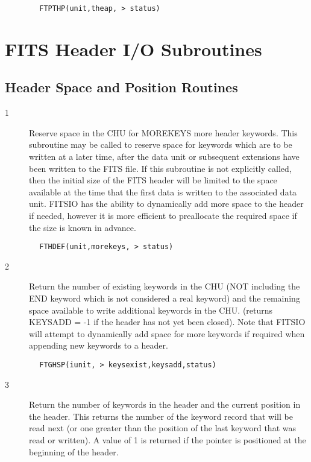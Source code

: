 \documentclass[11pt]{book}
\begin{document}
\begin{verbatim}
        FTPTHP(unit,theap, > status)
\end{verbatim}


\section{FITS Header I/O Subroutines}


\subsection{Header Space and Position Routines \label{FTHDEF}}


\begin{description}
\item[1 ] Reserve space in the CHU for MOREKEYS more header keywords.
    This subroutine may be called to reserve space for keywords which are
    to be written at a later time, after the data unit or subsequent
    extensions have been written to the FITS file.  If this subroutine is
    not explicitly called, then the initial size of the FITS header will be
    limited to the space available at the time that  the first data is written
    to the associated data unit.   FITSIO has the ability to dynamically
    add more space to the header if needed, however it is more efficient
   to preallocate the required space if the size is known in advance.
\end{description}

\begin{verbatim}
        FTHDEF(unit,morekeys, > status)
\end{verbatim}

\begin{description}
\item[2 ] Return the number of existing keywords in the CHU (NOT including the
    END keyword which is not considered a real keyword) and the remaining
    space available to write additional keywords in the CHU.  (returns
    KEYSADD = -1 if the header has not yet been closed).
    Note that FITSIO will attempt to dynamically add space for more
   keywords if required when appending new keywords to a header.
\end{description}

\begin{verbatim}
        FTGHSP(iunit, > keysexist,keysadd,status)
\end{verbatim}

\begin{description}
\item[3 ] Return the number of keywords in the header and the current position
    in the header.  This returns the number of the keyword record that
    will be read next (or one greater than the position of the last keyword
    that was read or written). A value of 1 is returned if the pointer is
   positioned at the beginning of the header.
\end{description}
\end{document}
